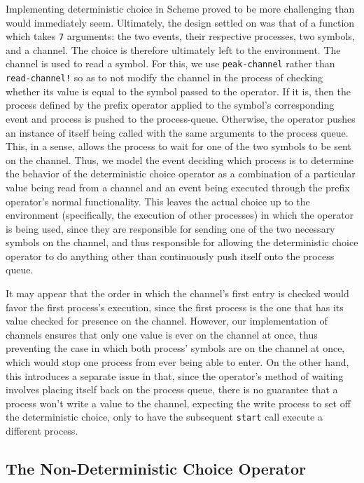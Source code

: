 \documentclass{article}
\begin{document}
Implementing deterministic choice in Scheme proved to be more challenging than would immediately seem. Ultimately, the design settled on was that of a function 
which takes \texttt{7} arguments: the two events, their respective processes, two symbols, and a channel. The choice is therefore ultimately left to the environment.
The channel is used to read a symbol. For this, we use \texttt{peak-channel} rather than \texttt{read-channel!} so as to not modify the channel in the process of
checking whether its value is equal to the symbol passed to the operator. If it is, then the process defined by the prefix operator applied to the symbol's corresponding event and process is pushed to the process-queue. Otherwise, the operator pushes an instance of itself being called with the same arguments to the process queue. This, in a sense, allows the process to wait for one of the two symbols to be sent on the channel. Thus, we model the event deciding which process is to determine the behavior of the deterministic choice operator as a combination of a particular value being read from a channel and an event being executed through the prefix operator's normal functionality. This leaves the actual choice up to the environment (specifically, the execution of other processes) in which the operator is being used, since they are responsible for sending one of the two necessary symbols on the channel, and thus responsible for allowing the deterministic choice operator to do anything other than continuously push itself onto the process queue. 

It may appear that the order in which the channel's first entry is checked would favor the first process's execution, since the first process is the one that has its value checked for presence on the channel. However, our implementation of channels ensures that
only one value is ever on the channel at once, thus preventing the case in which both process' symbols are on the channel at once, which would stop one process from
ever being able to enter. On the other hand, this introduces a separate issue in that, since the operator's method of waiting involves placing itself back on the
process queue, there is no guarantee that a process won't write a value to the channel, expecting the write process to set off the deterministic choice, only to have
the subsequent \texttt{start} call execute a different process.

\subsection*{The Non-Deterministic Choice Operator}
\end{document}

